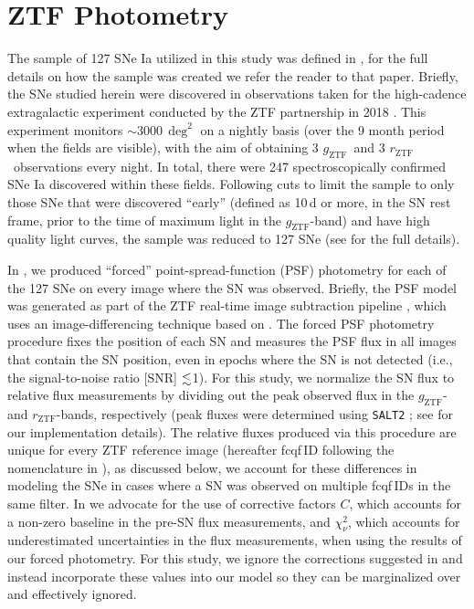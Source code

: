 \documentclass[twocolumn]{./aastex63}
\newcommand{\rztf}{$r_\mathrm{ZTF}$}
\newcommand{\gztf}{$g_\mathrm{ZTF}$}
\begin{document}
\section{ZTF Photometry}

The sample of 127 SNe Ia utilized in this study was defined in \citet{Yao19},
for the full details on how the sample was created we refer the reader to
that paper. Briefly, the SNe studied herein were discovered in observations
taken for the high-cadence extragalactic experiment conducted by the ZTF
partnership in 2018 \citep{Bellm19a}. This experiment monitors
$\sim$3000\,$\deg^2$ on a nightly basis (over the 9 month period when the
fields are visible), with the aim of obtaining 3 \gztf\ and 3 \rztf\
observations every night. In total, there were 247 spectroscopically
confirmed SNe Ia discovered within these fields. Following cuts to limit the
sample to only those SNe that were discovered ``early'' (defined as 10\,d or
more, in the SN rest frame, prior to the time of maximum light in the
\gztf-band) and have high quality light curves, the sample was reduced to 127
SNe (see \citealt{Yao19} for the full details).

In \citet{Yao19}, we produced ``forced'' point-spread-function (PSF)
photometry for each of the 127 SNe on every image where the SN was observed.
Briefly, the PSF model was generated as part of the ZTF real-time image
subtraction pipeline \citep{Masci19}, which uses an image-differencing
technique based on \citet{Zackay16}. The forced PSF photometry procedure
fixes the position of each SN and measures the PSF flux in all images that
contain the SN position, even in epochs where the SN is not detected (i.e.,
the signal-to-noise ratio [SNR] $\lesssim$1). For this study, we normalize the SN
flux to relative flux measurements by dividing out the peak observed flux in
the \gztf- and \rztf-bands, respectively (peak fluxes were determined using
\texttt{SALT2} \citealt{Guglielmo93}; see \citealt{Yao19} for our
implementation details). The relative fluxes produced via this procedure are
unique for every ZTF reference image (hereafter fcqf\,ID following the
nomenclature in \citealt{Yao19}), as discussed below, we account for these
differences in modeling the SNe in cases where a SN was observed on multiple
fcqf\,IDs in the same filter. In \citet{Yao19} we advocate for the use of
corrective factors $C$, which accounts for a non-zero baseline in the pre-SN
flux measurements, and $\chi^2_{\nu}$, which accounts for underestimated
uncertainties in the flux measurements, when using the results of our forced
photometry. For this study, we ignore the corrections suggested in
\citet{Yao19} and instead incorporate these values into our model so they can
be marginalized over and effectively ignored.
\end{document}
